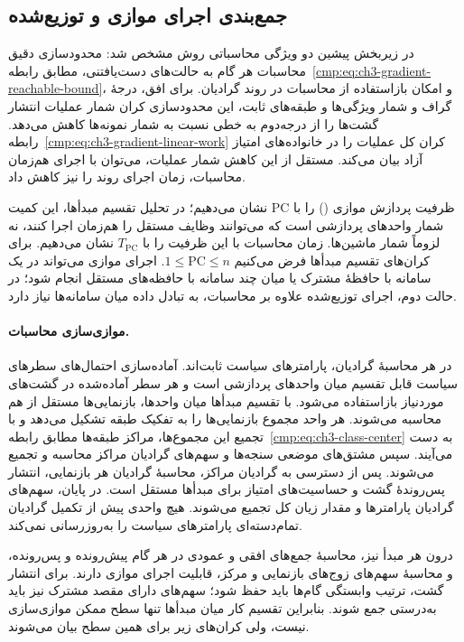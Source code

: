 \subsection{جمع‌بندی اجرای موازی و توزیع‌شده}
\label{cmp:subsec:ch3-gradient-complexity}

در زیربخش پیشین دو ویژگی محاسباتی روش مشخص شد:
محدودسازی دقیق محاسبات هر گام به حالت‌های دست‌یافتنی،
مطابق رابطه~\eqref{cmp:eq:ch3-gradient-reachable-bound}،
و امکان بازاستفاده از محاسبات در روند گرادیان.
برای افق، درجهٔ گراف و شمار ویژگی‌ها و طبقه‌های ثابت،
این محدودسازی کران شمار عملیات انتشار گشت‌ها را
از درجه‌دوم به خطی نسبت به شمار نمونه‌ها کاهش می‌دهد.
رابطه~\eqref{cmp:eq:ch3-gradient-linear-work}
کران کل عملیات را در خانواده‌های امتیاز آزاد بیان
می‌کند. مستقل از این کاهش شمار عملیات، می‌توان
با اجرای هم‌زمان محاسبات، زمان اجرای روند را نیز
کاهش داد.

ظرفیت پردازش موازی ()
را با $\mathrm{PC}$ نشان می‌دهیم؛ در تحلیل تقسیم
مبدأها، این کمیت شمار واحدهای پردازشی است که
می‌توانند وظایف مستقل را هم‌زمان اجرا کنند، نه
لزوماً شمار ماشین‌ها. زمان محاسبات با این ظرفیت
را با $T_{\mathrm{PC}}$ نشان می‌دهیم.
برای کران‌های تقسیم مبدأها فرض می‌کنیم
$1\le\mathrm{PC}\le n$.
اجرای موازی می‌تواند در یک سامانه با حافظهٔ
مشترک یا میان چند سامانه با حافظه‌های مستقل
انجام شود؛ در حالت دوم، اجرای توزیع‌شده
علاوه بر محاسبات، به تبادل داده میان سامانه‌ها
نیاز دارد.

\paragraph{موازی‌سازی محاسبات.}
در هر محاسبهٔ گرادیان، پارامترهای سیاست ثابت‌اند.
آماده‌سازی احتمال‌های سطرهای سیاست قابل تقسیم
میان واحدهای پردازشی است و هر سطر آماده‌شده
در گشت‌های موردنیاز بازاستفاده می‌شود.
با تقسیم مبدأها میان واحدها، بازنمایی‌ها مستقل
از هم محاسبه می‌شوند. هر واحد مجموع بازنمایی‌ها
را به تفکیک طبقه تشکیل می‌دهد و با تجمیع این
مجموع‌ها، مراکز طبقه‌ها مطابق
رابطه~\eqref{cmp:eq:ch3-class-center} به دست می‌آیند.
سپس مشتق‌های موضعی سنجه‌ها و سهم‌های گرادیان
مراکز محاسبه و تجمیع می‌شوند. پس از دسترسی
به گرادیان مراکز، محاسبهٔ گرادیان هر بازنمایی،
انتشار پس‌روندهٔ گشت و حساسیت‌های امتیاز برای
مبدأها مستقل است. در پایان، سهم‌های گرادیان
پارامترها و مقدار زیان کل تجمیع می‌شوند.
هیچ واحدی پیش از تکمیل گرادیان تمام‌دسته‌ای
پارامترهای سیاست را به‌روزرسانی نمی‌کند.

درون هر مبدأ نیز، محاسبهٔ جمع‌های افقی و عمودی
در هر گام پیش‌رونده و پس‌رونده، و محاسبهٔ سهم‌های
زوج‌های بازنمایی و مرکز، قابلیت اجرای موازی
دارند. برای انتشار گشت، ترتیب وابستگی گام‌ها
باید حفظ شود؛ سهم‌های دارای مقصد مشترک نیز
باید به‌درستی جمع شوند. بنابراین تقسیم کار میان
مبدأها تنها سطح ممکن موازی‌سازی نیست، ولی
کران‌های زیر برای همین سطح بیان می‌شوند.

